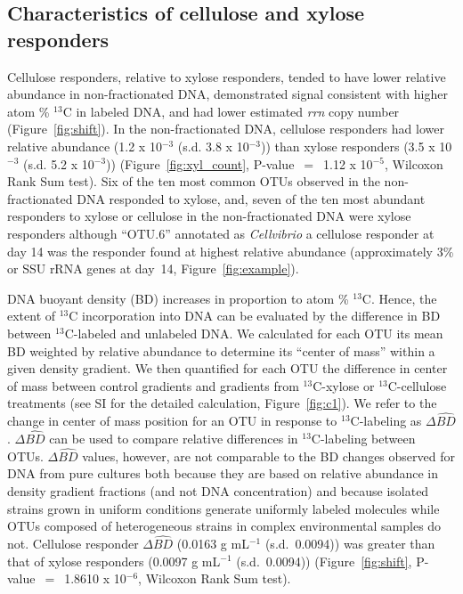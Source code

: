 \subsection{Characteristics of cellulose and xylose responders}
Cellulose responders, relative to xylose responders, tended to have lower
relative abundance in non-fractionated DNA, demonstrated signal consistent with
higher atom \% $^{13}$C in labeled DNA, and had lower estimated \textit{rrn}
copy number (Figure~\ref{fig:shift}). In the non-fractionated DNA, cellulose
responders had lower relative abundance (1.2 x 10$^{-3}$ (s.d. 3.8
x 10$^{-3}$)) than xylose responders (3.5 x 10$^{-3}$ (s.d. 5.2 x 10$^{-3}$))
(Figure~\ref{fig:xyl_count}, P-value~$=$~1.12 x 10$^{-5}$, Wilcoxon Rank Sum
test). Six of the ten most common OTUs observed in the non-fractionated DNA
responded to xylose, and, seven of the ten most abundant responders to xylose
or cellulose in the non-fractionated DNA were xylose responders although
``OTU.6'' annotated as \textit{Cellvibrio} a cellulose responder at day 14 was
the responder found at highest relative abundance (approximately 3\% or SSU
rRNA genes at day~14, Figure~\ref{fig:example}).

DNA buoyant density (BD) increases in proportion to atom \% $^{13}$C.
Hence, the extent of $^{13}$C incorporation into DNA can be evaluated by
the difference in BD between $^{13}$C-labeled and unlabeled DNA. We
calculated for each OTU its mean BD weighted by relative abundance to
determine its ``center of mass'' within a given density gradient. We then
quantified for each OTU the difference in center of mass between control
gradients and gradients from $^{13}$C-xylose or $^{13}$C-cellulose treatments
(see SI for the detailed calculation, Figure~\ref{fig:c1}). We refer to the
change in center of mass position for an OTU in response to $^{13}$C-labeling
as $\Delta\hat{BD}$. $\Delta\hat{BD}$ can be used to compare relative
differences in $^{13}$C-labeling between OTUs. $\Delta\hat{BD}$ values,
however, are not comparable to the BD changes observed for DNA from pure
cultures both because they are  based on relative abundance in density gradient
fractions (and not DNA concentration) and because isolated strains grown in
uniform conditions generate uniformly labeled molecules while OTUs composed of
heterogeneous strains in complex environmental samples do not. Cellulose
responder $\Delta\hat{BD}$ (0.0163 g mL$^{-1}$ (s.d.~0.0094)) was greater than
that of xylose responders (0.0097 g mL$^{-1}$ (s.d.~0.0094))
(Figure~\ref{fig:shift}, P-value~$=$~1.8610 x 10$^{-6}$, Wilcoxon Rank Sum
test). 


